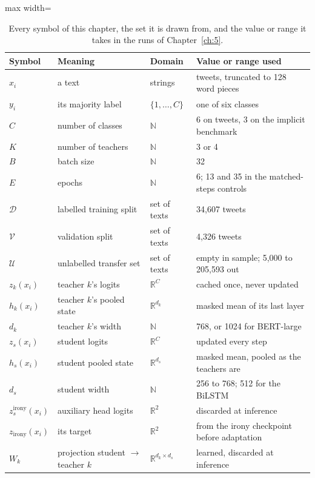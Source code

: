 \begin{table}[htbp]
\centering
\footnotesize
\caption[Symbols used in Chapter 3]{Every symbol of this chapter, the set it is drawn from, and the
value or range it takes in the runs of Chapter~\ref{ch:5}.}
\label{tab:symbols}
\begin{adjustbox}{max width=\textwidth}
\begin{tabular}{llll}
\toprule
Symbol & Meaning & Domain & Value or range used \\
\midrule
$x_i$ & a text & strings & tweets, truncated to 128 word pieces \\
$y_i$ & its majority label & $\{1,\dots,C\}$ & one of six classes \\
$C$ & number of classes & $\mathbb{N}$ & 6 on tweets, 3 on the implicit benchmark \\
$K$ & number of teachers & $\mathbb{N}$ & 3 or 4 \\
$B$ & batch size & $\mathbb{N}$ & 32 \\
$E$ & epochs & $\mathbb{N}$ & 6; 13 and 35 in the matched-steps controls \\
$\mathcal{D}$ & labelled training split & set of texts & 34,607 tweets \\
$\mathcal{V}$ & validation split & set of texts & 4,326 tweets \\
$\mathcal{U}$ & unlabelled transfer set & set of texts & empty in sample; 5,000 to 205,593 out \\
$z_k(x_i)$ & teacher $k$'s logits & $\mathbb{R}^C$ & cached once, never updated \\
$h_k(x_i)$ & teacher $k$'s pooled state & $\mathbb{R}^{d_k}$ & masked mean of its last layer \\
$d_k$ & teacher $k$'s width & $\mathbb{N}$ & 768, or 1024 for BERT-large \\
$z_s(x_i)$ & student logits & $\mathbb{R}^C$ & updated every step \\
$h_s(x_i)$ & student pooled state & $\mathbb{R}^{d_s}$ & masked mean, pooled as the teachers are \\
$d_s$ & student width & $\mathbb{N}$ & 256 to 768; 512 for the BiLSTM \\
$z^{\mathrm{irony}}_s(x_i)$ & auxiliary head logits & $\mathbb{R}^2$ & discarded at inference \\
$z_{\mathrm{irony}}(x_i)$ & its target & $\mathbb{R}^2$ & from the irony checkpoint before adaptation \\
$W_k$ & projection student $\to$ teacher $k$ & $\mathbb{R}^{d_k \times d_s}$ & learned, discarded at inference \\

\end{tabular}
\end{adjustbox}
\end{table}
